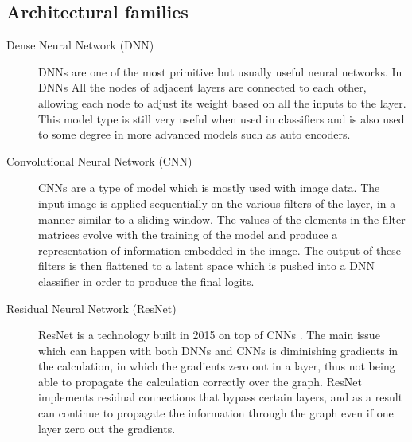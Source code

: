 \subsection{Architectural families}
\begin{description}
    \item [Dense Neural Network (DNN)] DNNs are one of the most primitive but usually useful neural networks. In DNNs All the nodes of adjacent layers are connected to each other, allowing each node to adjust its weight based on all the inputs to the layer. This model type is still very useful when used in classifiers and is also used to some degree in more advanced models such as auto encoders.
    \item [Convolutional Neural Network (CNN)] CNNs are a type of model which is mostly used with image data. The input image is applied sequentially on the various filters of the layer, in a manner similar to a sliding window. The values of the elements in the filter matrices evolve with the training of the model and produce a representation of information embedded in the image. The output of these filters is then flattened to a latent space which is pushed into a DNN classifier in order to produce the final logits.
    \item [Residual Neural Network (ResNet)] ResNet is a technology built in 2015 on top of CNNs \cite{he_deep_2015}. The main issue which can happen with both DNNs and CNNs is diminishing gradients in the calculation, in which the gradients zero out in a layer, thus not being able to propagate the calculation correctly over the graph. ResNet implements residual connections that bypass certain layers, and as a result can continue to propagate the information through the graph even if one layer zero out the gradients.
\end{description}

